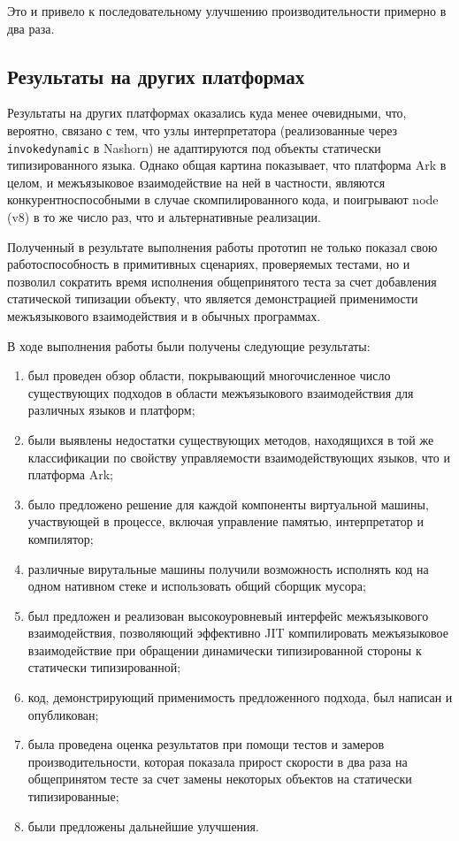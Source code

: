 \documentclass[times
]{itmo-student-thesis}
\begin{document}
Это и привело к последовательному улучшению производительности примерно в два раза.

\subsection{Результаты на других платформах}
Результаты на других платформах оказались куда менее очевидными, что, вероятно, связано с тем, что узлы интерпретатора (реализованные через \texttt{invokedynamic} в Nashorn) не адаптируются под объекты статически типизированного языка. Однако общая картина показывает, что платформа Ark в целом, и межъязыковое взаимодействие на ней в частности, являются конкурентноспособными в случае скомпилированного кода, и поигрывают node (v8) в то же число раз, что и альтернативные реализации.

\chapterconclusion
Полученный в результате выполнения работы прототип не только показал свою работоспособность в примитивных сценариях, проверяемых тестами, но и позволил сократить время исполнения общепринятого теста за счет добавления статической типизации объекту, что является демонстрацией применимости межъязыкового взаимодействия и в обычных программах.

\startconclusionpage
В ходе выполнения работы были получены следующие результаты:
\begin{enumerate}
	\item был проведен обзор области, покрывающий многочисленное число существующих подходов в области межъязыкового взаимодействия для различных языков и платформ;
	\item были выявлены недостатки существующих методов, находящихся в той же классификации по свойству управляемости взаимодействующих языков, что и платформа Ark;
	\item было предложено решение для каждой компоненты виртуальной машины, участвующей в процессе, включая управление памятью, интерпретатор и компилятор;
	\item различные вирутальные машины получили возможность исполнять код на одном нативном стеке и использовать общий сборщик мусора;
	\item был предложен и реализован высокоуровневый интерфейс межъязыкового взаимодействия, позволяющий эффективно JIT компилировать межъязыковое взаимодействие при обращении динамически типизированной стороны к статически типизированной;
	\item код, демонстрирующий применимость предложенного подхода, был написан и опубликован;
	\item была проведена оценка результатов при помощи тестов и замеров производительности, которая показала прирост скорости в два раза на общепринятом тесте за счет замены некоторых объектов на статически типизированные;
	\item были предложены дальнейшие улучшения.
\end{enumerate}
\end{document}
